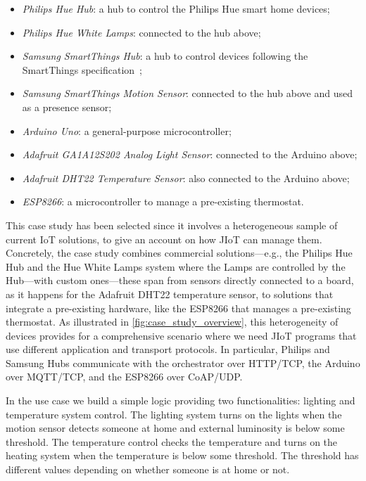 \begin{itemize} 

\item \emph{Philips Hue Hub}: a hub to control the Philips Hue smart home
devices;

\item \emph{Philips Hue White Lamps}: connected to the hub above; \item
\emph{Samsung SmartThings Hub}: a hub to control devices following  the
SmartThings specification~\cite{60};

\item \emph{Samsung SmartThings Motion Sensor}: connected to the hub above and
used as a presence sensor;

\item \emph{Arduino Uno}: a general-purpose microcontroller;

\item \emph{Adafruit GA1A12S202 Analog Light Sensor}: connected to the Arduino
above;

\item \emph{Adafruit DHT22 Temperature Sensor}: also connected to the Arduino
above;

\item \emph{ESP8266}: a microcontroller to manage a pre-existing  thermostat.

\end{itemize}

This case study has been selected since it involves a heterogeneous sample of
current IoT solutions, to give an account on how JIoT can manage them.
Concretely, the case study combines commercial solutions---e.g., the Philips
Hue Hub and the Hue White Lamps system where the Lamps are controlled by the
Hub---with custom ones---these span from sensors directly connected to a
board, as it happens for the Adafruit DHT22 temperature sensor, to solutions
that integrate a pre-existing hardware, like the ESP8266 that manages a
pre-existing thermostat. As illustrated in \cref{fig:case_study_overview},
this heterogeneity of devices provides for a comprehensive scenario where we
need JIoT programs that use different application and transport protocols. In
particular, Philips and Samsung Hubs communicate with the orchestrator over
HTTP/TCP, the Arduino over MQTT/TCP, and the ESP8266 over CoAP/UDP.

In the use case we build a simple logic providing two functionalities:
lighting and temperature system control. The lighting system turns on the
lights when the motion sensor detects someone at home and external luminosity
is below some threshold. The temperature control checks the temperature and
turns on the heating system when the temperature is below some threshold. The
threshold has different values depending on whether someone is at home or not.

